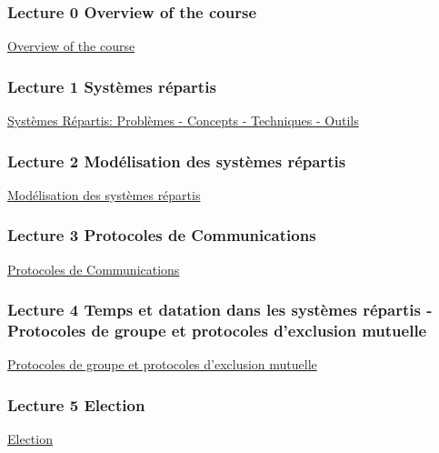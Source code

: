 \documentclass[ 12pt]{article}
\begin{document}
\subsubsection{Lecture 0 {Overview of the course }}
  
  \href{http://mery54.github.io/teaching/aspd/lecturesnotes/ASPD0.pdf}{Overview of the course }


\subsubsection{Lecture 1 {Systèmes répartis}}
  
\href{http://mery54.github.io/teaching/aspd/lecturesnotes/ASPD1.pdf}{Syst\`emes
  R\'epartis: Probl\`emes  - Concepts - Techniques - Outils}



\subsubsection{Lecture 2 {Mod\'elisation   des syst\`emes  r\'epartis}}
  
\href{http://mery54.github.io/teaching/aspd/lecturesnotes/ASPD2.pdf}{Mod\'elisation   des syst\`emes  r\'epartis}




\subsubsection{Lecture 3 {Protocoles de Communications}}
  
\href{http://mery54.github.io/teaching/aspd/lecturesnotes/ASPD3.pdf}{Protocoles de Communications}




\subsubsection{Lecture 4 Temps et datation  dans les syst\`emes 
  r\'epartis -  Protocoles de groupe et protocoles d'exclusion mutuelle }
  
\href{http://mery54.github.io/teaching/aspd/lecturesnotes/ASPD4.pdf}{Protocoles
  de groupe et protocoles d'exclusion mutuelle}


\subsubsection{Lecture 5 Election}
  
\href{http://mery54.github.io/teaching/aspd/lecturesnotes/ASPD5.pdf}{Election}
\end{document}
